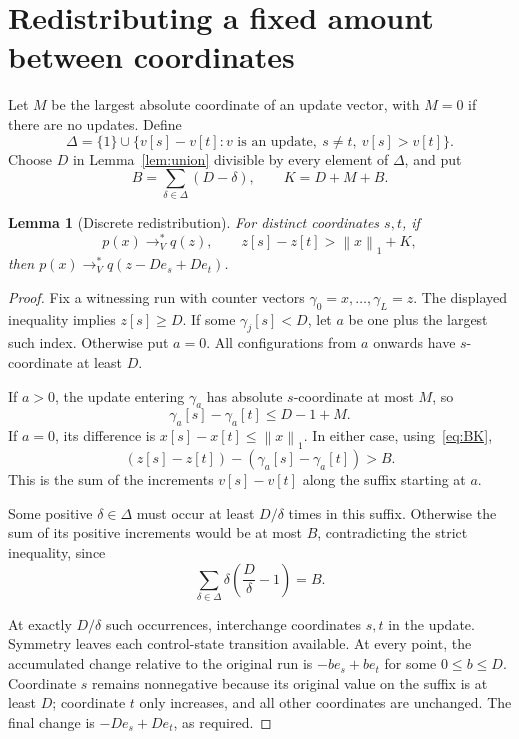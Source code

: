 \documentclass[11pt,a4paper]{article}
\newtheorem{lemma}[theorem]{Lemma}
\theoremstyle{remark}
\newcommand{\norm}[1]{\left\lVert #1\right\rVert_1}
\newcommand{\reach}{\longrightarrow_V^*}
\begin{document}
\section{Redistributing a fixed amount between coordinates}

Let $M$ be the largest absolute coordinate of an update vector, with $M=0$ if there are no updates. Define
\[
 \Delta=\{1\}\cup\{v[s]-v[t]:v\text{ is an update},\ s\ne t,\ v[s]>v[t]\}.
\]
Choose $D$ in Lemma~\ref{lem:union} divisible by every element of $\Delta$, and put
\begin{equation}\label{eq:BK}
 B=\sum_{\delta\in\Delta}(D-\delta),\qquad K=D+M+B.
\end{equation}

\begin{lemma}[Discrete redistribution]\label{lem:redistribute}
For distinct coordinates $s,t$, if
\[
 p(x)\reach q(z),\qquad z[s]-z[t]>\norm{x}+K,
\]
then $p(x)\reach q(z-De_s+De_t)$.
\end{lemma}

\begin{proof}
Fix a witnessing run with counter vectors $\gamma_0=x,\ldots,\gamma_L=z$. The displayed inequality implies $z[s]\ge D$. If some $\gamma_j[s]<D$, let $a$ be one plus the largest such index. Otherwise put $a=0$. All configurations from $a$ onwards have $s$-coordinate at least $D$.

If $a>0$, the update entering $\gamma_a$ has absolute $s$-coordinate at most $M$, so
\[
 \gamma_a[s]-\gamma_a[t]\le D-1+M.
\]
If $a=0$, its difference is $x[s]-x[t]\le\norm{x}$. In either case, using~\eqref{eq:BK},
\[
 (z[s]-z[t])-(\gamma_a[s]-\gamma_a[t])>B.
\]
This is the sum of the increments $v[s]-v[t]$ along the suffix starting at $a$.

Some positive $\delta\in\Delta$ must occur at least $D/\delta$ times in this suffix. Otherwise the sum of its positive increments would be at most $B$, contradicting the strict inequality, since
\[
 \sum_{\delta\in\Delta}\delta\left(\frac D\delta-1\right)=B.
\]

At exactly $D/\delta$ such occurrences, interchange coordinates $s,t$ in the update. Symmetry leaves each control-state transition available. At every point, the accumulated change relative to the original run is $-be_s+be_t$ for some $0\le b\le D$. Coordinate $s$ remains nonnegative because its original value on the suffix is at least $D$; coordinate $t$ only increases, and all other coordinates are unchanged. The final change is $-De_s+De_t$, as required.
\end{proof}
\end{document}
